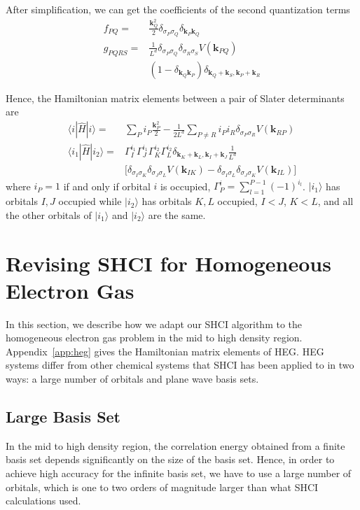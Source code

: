 After simplification, we can get the coefficients of the second quantization terms
\begin{align*}
f_{PQ}= & \frac{\mathbf{k}_Q^2}{2}\delta_{\sigma_P\sigma_Q}\delta_{\mathbf{k}_P\mathbf{k}_Q}\\
g_{PQRS}= & \frac{1}{L^d}\delta_{\sigma_P\sigma_Q}\delta_{\sigma_R\sigma_S}V(\mathbf{k}_{PQ})\\
& (1-\delta_{\mathbf{k}_Q\mathbf{k}_P})\delta_{\mathbf{k}_Q+\mathbf{k}_S,\mathbf{k}_P+\mathbf{k}_R}
\end{align*}

Hence, the Hamiltonian matrix elements between a pair of Slater determinants are
\begin{align*}
\langle i|\hat{H}|i\rangle  = & \sum_{P}i_P\frac{\mathbf{k}_P^2}{2}-\frac{1}{2L^d}\sum_{P\ne R}i_Pi_R\delta_{\sigma_P\sigma_R}V(\mathbf{k}_{RP})\\
\langle i_1|\hat{H}|i_2\rangle  = &  \Gamma_I^{i_1}\Gamma_J^{i_1}\Gamma_K^{i_2}\Gamma_L^{i_2}\delta_{\mathbf{k}_K+\mathbf{k}_L,\mathbf{k}_I+\mathbf{k}_J}\frac{1}{L^d}\\
&  \lbrack\delta_{\sigma_I\sigma_K}\delta_{\sigma_J\sigma_L}V(\mathbf{k}_{IK})-\delta_{\sigma_I\sigma_L}\delta_{\sigma_J\sigma_K}V(\mathbf{k}_{IL})\rbrack
\end{align*}
where $i_P=1$ if and only if orbital $i$ is occupied, $\Gamma_P^i=\sum_{l=1}^{P-1}(-1)^{i_l}$. $|i_1\rangle$ has orbitals $I,J$ occupied while $|i_2\rangle$ has orbitals $K,L$ occupied, $I<J$, $K<L$, and all the other orbitals of $|i_1\rangle$ and $|i_2\rangle$ are the same.

\section{Revising SHCI for Homogeneous Electron Gas}
\label{HEG}

In this section, we describe how we adapt our SHCI algorithm to the homogeneous electron gas problem in the mid to high density region.
Appendix~\ref{app:heg} gives the Hamiltonian matrix elements of HEG.
HEG systems differ from other chemical systems that SHCI has been applied to in two ways: a large number of orbitals and plane wave basis sets.

\subsection{Large Basis Set}
In the mid to high density region, the correlation energy obtained from a finite basis set depends significantly on the size of the basis set.
Hence, in order to achieve high accuracy for the infinite basis set, we have to use a large number of orbitals, which is one to two orders of magnitude larger than what SHCI calculations used.

